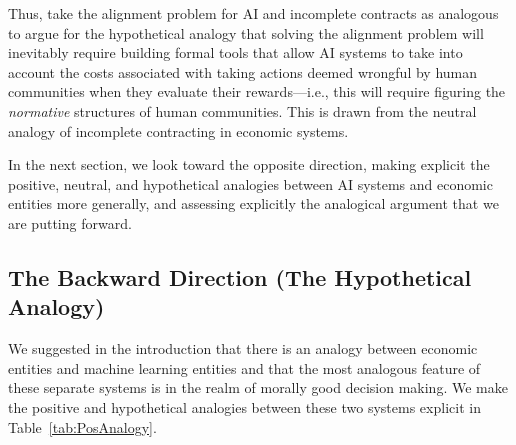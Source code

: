 \documentclass{amsart}
\theoremstyle{indented}
\theoremstyle{indentedProp}
\theoremstyle{indented}
\theoremstyle{indented}
\theoremstyle{indented}
\theoremstyle{indented}
\theoremstyle{indented}
\begin{document}
Thus, \citet{Hadfield-Menell-Hadfield-2019} take the alignment problem for AI and incomplete contracts as analogous to argue for the hypothetical analogy that solving the alignment problem will inevitably require building formal tools that allow AI systems to take into account the costs associated with taking actions deemed wrongful by human communities when they evaluate their rewards---i.e., this will require figuring the {\it normative} structures of human communities. This is drawn from the neutral analogy of incomplete contracting in economic systems. 

In the next section, we look toward the opposite direction, making explicit the positive, neutral, and hypothetical analogies between AI systems and economic entities more generally, and assessing explicitly the analogical argument that we are putting forward.

\subsection{The Backward Direction (The Hypothetical Analogy)}
\label{sec:BackwardDirection}

We suggested in the introduction that there is an analogy between economic entities and machine learning entities and that the most analogous feature of these separate systems is in the realm of morally good decision making. We make the positive and hypothetical analogies between these two systems explicit in Table~\ref{tab:PosAnalogy}.
\end{document}
